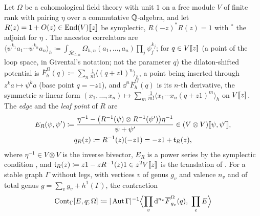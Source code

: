 \begin{defn}
\label{def:set-graphsum}
Let $\Omega$ be a cohomological field theory with unit $1$ \cite[Def.~0.3]{PPZ15} on a free module $V$ of finite rank with pairing $\eta$ over a commutative $\mathbb{Q}$-algebra, and let $R(z)=1+O(z)\in\operatorname{End}(V)[\![ z ]\!]$ be symplectic, $R(-z)^*R(z)=1$ with ${}^*$ the adjoint for $\eta$ \cite[(5)]{PPZ15}. The ancestor correlators are $\langle\psi^{k_1}a_1\cdots\psi^{k_n}a_n\rangle_h\coloneqq\int_{\overline{\mathcal M}_{h,n}}\Omega_{h,n}(a_1,\dots,a_n)\prod_j\psi_j^{k_j}$; for $q\in V[\![ z ]\!]$ (a point of the loop space, in Givental's notation; not the parameter $q$) the dilaton-shifted potential is $\overline F^\Omega_h(q)\coloneqq\sum_n\frac1{n!}\langle(q+z1)^n\rangle_h$, a point being inserted through $z^ka\mapsto\psi^ka$ (base point $q=-z1$), and $\dd^n\overline F^\Omega_h(q)$ is its $n$-th derivative, the symmetric $n$-linear form $(x_1,\dots,x_n)\mapsto\sum_m\frac1{m!}\langle x_1\cdots x_n(q+z1)^m\rangle_h$ on $V[\![ z ]\!]$. The \emph{edge} and the \emph{leaf point} of $R$ are
\begin{gather*}
E_R(\psi,\psi')\coloneqq\frac{\eta^{-1}-\bigl(R^{-1}(\psi)\otimes R^{-1}(\psi')\bigr)\eta^{-1}}{\psi+\psi'}\in(V\otimes V)[\![ \psi,\psi' ]\!],\\
q_R(z)\coloneqq R^{-1}(z)(-z1)=-z1+\mathfrak{t}_R(z),
\end{gather*}
where $\eta^{-1}\in V\otimes V$ is the inverse bivector, $E_R$ is a power series by the symplectic condition \cite[Rem.~2.1, (6)]{PPZ15}, and $\mathfrak{t}_R(z)\coloneqq z1-zR^{-1}(z)1\in z^2V[\![ z ]\!]$ is the translation of \cite[Def.~2.13]{PPZ15}. For a stable graph $\Gamma$ without legs, with vertices $v$ of genus $g_v$ and valence $n_v$ and of total genus $g=\sum_vg_v+h^1(\Gamma)$, the contraction
\[
\mathrm{Cont}_\Gamma[E,q;\Omega]\coloneqq|\operatorname{Aut}\Gamma|^{-1}\Bigl\langle\prod_v\mathrm{d}^{n_v}\overline F^\Omega_{g_v}(q),\ \prod_eE\Bigr\rangle
\]

\end{defn}
